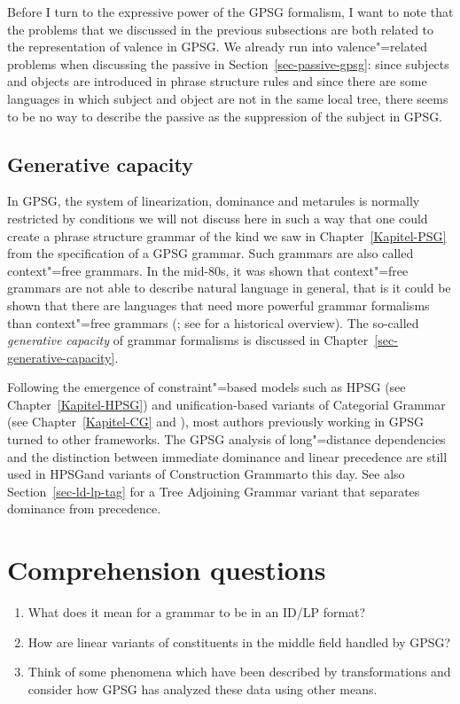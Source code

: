 Before I turn to the expressive power of the GPSG formalism, I want to note that the problems that
we discussed in the previous subsections are both related to the representation of valence in GPSG. We
already run into valence"=related problems when discussing the passive in Section~\ref{sec-passive-gpsg}: since subjects and objects are introduced in
phrase structure rules and since there are some languages in which subject and object are not in the
same local tree, there seems to be no way to describe the passive as the suppression of the subject
in GPSG.

\subsection{Generative capacity}

In GPSG, the system of linearization, dominance and metarules is normally restricted by conditions
we will not discuss here in such a way that one could create a phrase structure grammar of the kind
we saw in Chapter~\ref{Kapitel-PSG} from the specification of a GPSG grammar. Such grammars are also called
context"=free grammars. In the mid-80s, it was
shown that context"=free grammars are not able to describe natural language in general, that is it
could be shown that there are languages that need more powerful grammar formalisms than
context"=free grammars (\citealp{Shieber85a,Culy85a}; see  for a historical
overview). The so-called \emph{generative capacity} of grammar formalisms is discussed in
Chapter~\ref{sec-generative-capacity}.

Following the emergence of constraint"=based models such as HPSG (see Chapter~\ref{Kapitel-HPSG}) and
unification-based variants of Categorial Grammar (see Chapter~\ref{Kapitel-CG} and
\citealp{Uszkoreit86d}), most authors previously working in GPSG turned to other frameworks. The GPSG
analysis of long"=distance dependencies and the distinction between immediate dominance and linear precedence are
still used in HPSG\indexhpsg and variants of Construction Grammar\indexcxg to this day. See also
Section~\ref{sec-ld-lp-tag} for a Tree Adjoining Grammar variant that separates dominance from precedence.

\section*{Comprehension questions}

\begin{enumerate}
\item What does it mean for a grammar to be in an ID/LP format?
\item How are linear variants of constituents in the middle field handled by GPSG?
\item Think of some phenomena which have been described by transformations and consider how GPSG has analyzed these data using other means.
\end{enumerate}

